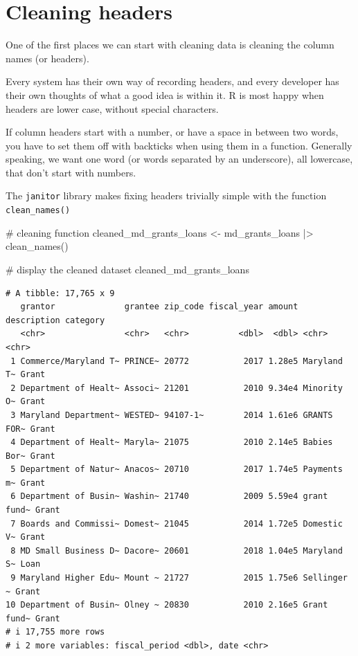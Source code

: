 \documentclass[
  letterpaper,
  DIV=11,
  numbers=noendperiod]{scrreprt}
\newenvironment{Shaded}{\begin{snugshade}}{\end{snugshade}}
\newcommand{\CommentTok}[1]{\textcolor[rgb]{0.37,0.37,0.37}{#1}}
\newcommand{\FunctionTok}[1]{\textcolor[rgb]{0.28,0.35,0.67}{#1}}
\newcommand{\NormalTok}[1]{\textcolor[rgb]{0.00,0.23,0.31}{#1}}
\newcommand{\OtherTok}[1]{\textcolor[rgb]{0.00,0.23,0.31}{#1}}
\newcommand{\SpecialCharTok}[1]{\textcolor[rgb]{0.37,0.37,0.37}{#1}}
\begin{document}
\hypertarget{cleaning-headers}{%
\section{Cleaning headers}\label{cleaning-headers}}

One of the first places we can start with cleaning data is cleaning the
column names (or headers).

Every system has their own way of recording headers, and every developer
has their own thoughts of what a good idea is within it. R is most happy
when headers are lower case, without special characters.

If column headers start with a number, or have a space in between two
words, you have to set them off with backticks when using them in a
function. Generally speaking, we want one word (or words separated by an
underscore), all lowercase, that don't start with numbers.

The \texttt{janitor} library makes fixing headers trivially simple with
the function \texttt{clean\_names()}

\begin{Shaded}
\begin{Highlighting}[]
\CommentTok{\# cleaning function}
\NormalTok{cleaned\_md\_grants\_loans }\OtherTok{\textless{}{-}}\NormalTok{ md\_grants\_loans }\SpecialCharTok{|\textgreater{}}
  \FunctionTok{clean\_names}\NormalTok{()}

\CommentTok{\# display the cleaned dataset}
\NormalTok{cleaned\_md\_grants\_loans}
\end{Highlighting}
\end{Shaded}

\begin{verbatim}
# A tibble: 17,765 x 9
   grantor              grantee zip_code fiscal_year amount description category
   <chr>                <chr>   <chr>          <dbl>  <dbl> <chr>       <chr>   
 1 Commerce/Maryland T~ PRINCE~ 20772           2017 1.28e5 Maryland T~ Grant   
 2 Department of Healt~ Associ~ 21201           2010 9.34e4 Minority O~ Grant   
 3 Maryland Department~ WESTED~ 94107-1~        2014 1.61e6 GRANTS FOR~ Grant   
 4 Department of Healt~ Maryla~ 21075           2010 2.14e5 Babies Bor~ Grant   
 5 Department of Natur~ Anacos~ 20710           2017 1.74e5 Payments m~ Grant   
 6 Department of Busin~ Washin~ 21740           2009 5.59e4 grant fund~ Grant   
 7 Boards and Commissi~ Domest~ 21045           2014 1.72e5 Domestic V~ Grant   
 8 MD Small Business D~ Dacore~ 20601           2018 1.04e5 Maryland S~ Loan    
 9 Maryland Higher Edu~ Mount ~ 21727           2015 1.75e6 Sellinger ~ Grant   
10 Department of Busin~ Olney ~ 20830           2010 2.16e5 Grant fund~ Grant   
# i 17,755 more rows
# i 2 more variables: fiscal_period <dbl>, date <chr>
\end{verbatim}
\end{document}
